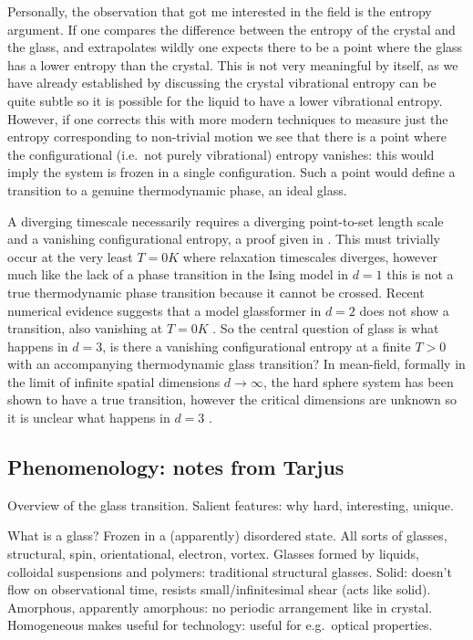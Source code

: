 Personally, the observation that got me interested in the field is the entropy argument.
If one compares the difference between the entropy of the crystal and the glass, and extrapolates wildly one expects there to be a point where the glass has a lower entropy than the crystal.
This is not very meaningful by itself, as we have already established by discussing the crystal vibrational entropy can be quite subtle so it is possible for the liquid to have a lower vibrational entropy.
However, if one corrects this with more modern techniques to measure just the entropy corresponding to non-trivial motion we see that there is a point where the configurational (i.e.\ not purely vibrational) entropy vanishes: this would imply the system is frozen in a single configuration.
Such a point would define a transition to a genuine thermodynamic phase, an ideal glass.

A diverging timescale necessarily requires a diverging point-to-set length scale and a vanishing configurational entropy, a proof given in \cite{?}.
This must trivially occur at the very least $T=0\si{K}$ where relaxation timescales diverges, however much like the lack of a phase transition in the Ising model in $d=1$ this is not a true thermodynamic phase transition because it cannot be crossed.
Recent numerical evidence suggests that a model glassformer in $d=2$ does not show a transition, also vanishing at $T=0\si{K}$ \cite{Berthier?}.
So the central question of glass is what happens in $d=3$, is there a vanishing configurational entropy at a finite $T > 0$ with an accompanying thermodynamic glass transition?
In mean-field, formally in the limit of infinite spatial dimensions $d \to \infty$, the hard sphere system has been shown to have a true transition, however the critical dimensions are unknown so it is unclear what happens in $d=3$ \cite{Parisi,Zamboni,Charbonneau,Kurchan,?,?}.


\subsection{Phenomenology: notes from Tarjus}

Overview of the glass transition.
Salient features: why hard, interesting, unique.

What is a glass?
Frozen in a (apparently) disordered state.
All sorts of glasses, structural, spin, orientational, electron, vortex.
Glasses formed by liquids, colloidal suspensions and polymers: traditional structural glasses.
Solid: doesn't flow on observational time, resists small/infinitesimal shear (acts like solid).
Amorphous, apparently amorphous: no periodic arrangement like in crystal.
Homogeneous makes useful for technology: useful for e.g.\ optical properties.

